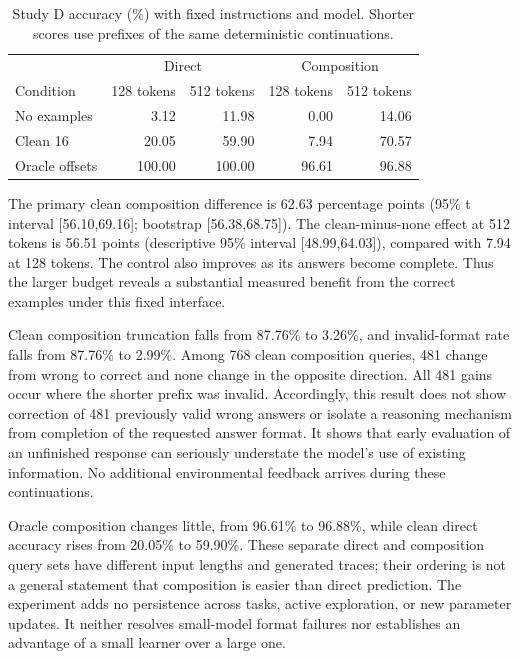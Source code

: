 \documentclass[11pt]{article}
\begin{document}
\begin{table}[htbp]
\centering\small
\begin{tabular}{lrrrr}
\toprule
& \multicolumn{2}{c}{Direct} & \multicolumn{2}{c}{Composition} \\
Condition & 128 tokens & 512 tokens & 128 tokens & 512 tokens \\
\midrule
No examples & 3.12 & 11.98 & 0.00 & 14.06 \\
Clean 16 & 20.05 & 59.90 & 7.94 & 70.57 \\
Oracle offsets & 100.00 & 100.00 & 96.61 & 96.88 \\
\bottomrule
\end{tabular}
\caption{Study D accuracy (\%) with fixed instructions and model. Shorter
scores use prefixes of the same deterministic continuations.}
\label{tab:d}
\end{table}

The primary clean composition difference is 62.63 percentage points (95\% t
interval [56.10,69.16]; bootstrap [56.38,68.75]). The clean-minus-none effect
at 512 tokens is 56.51 points (descriptive 95\% interval [48.99,64.03]),
compared with 7.94 at 128 tokens. The control also improves as its answers
become complete. Thus the larger budget reveals a substantial measured benefit
from the correct examples under this fixed interface.

Clean composition truncation falls from 87.76\% to 3.26\%, and invalid-format
rate falls from 87.76\% to 2.99\%. Among 768 clean composition queries, 481
change from wrong to correct and none change in the opposite direction. All
481 gains occur where the shorter prefix was invalid. Accordingly, this result
does not show correction of 481 previously valid wrong answers or isolate a
reasoning mechanism from completion of the requested answer format. It shows
that early evaluation of an unfinished response can seriously understate the
model's use of existing information. No additional environmental feedback
arrives during these continuations.

Oracle composition changes little, from 96.61\% to 96.88\%, while clean direct
accuracy rises from 20.05\% to 59.90\%. These separate direct and composition
query sets have different input lengths and generated traces; their ordering
is not a general statement that composition is easier than direct prediction.
The experiment adds no persistence across tasks, active exploration, or new
parameter updates. It neither resolves small-model format failures nor
establishes an advantage of a small learner over a large one.
\end{document}

